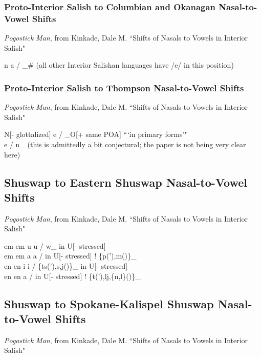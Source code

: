 \documentclass[11pt]{article}
\begin{document}
\subsubsection{Proto-Interior Salish to Columbian and Okanagan Nasal-to-Vowel Shifts}\textit{Pogostick Man}, from Kinkade, Dale M. ``Shifts of Nasals to Vowels in Interior Salish"

n \textrightarrow\hspace{0pt} a / _\# (all other Interior Salishan languages have /e/ in this position) \\

\subsubsection{Proto-Interior Salish to Thompson Nasal-to-Vowel Shifts}\textit{Pogostick Man}, from Kinkade, Dale M. ``Shifts of Nasals to Vowels in Interior Salish"

N[- glottalized] \textrightarrow\hspace{0pt} e / _O[+ same POA] \textquotedblleft \textquoteleft in primary forms'" \\
 \textrightarrow\hspace{0pt} e / n_ (this is admittedly a bit conjectural; the paper is not being very clear here)

\subsection{Shuswap to Eastern Shuswap Nasal-to-Vowel Shifts}\textit{Pogostick Man}, from Kinkade, Dale M. ``Shifts of Nasals to Vowels in Interior Salish"

em em \textrightarrow\hspace{0pt} u u / w_ in U[- stressed] \\
em em \textrightarrow\hspace{0pt} a a / in U[- stressed] ! \{p('),m()\}_ \\
en en \textrightarrow\hspace{0pt} i i / \{ts('),s,j()\}_ in U[- stressed] \\
en en \textrightarrow\hspace{0pt} a  / in U[- stressed] ! \{t('),l\super j,\{n,l\}()\}_

\subsection{Shuswap to Spokane-Kalispel Shuswap Nasal-to-Vowel Shifts}\textit{Pogostick Man}, from Kinkade, Dale M. ``Shifts of Nasals to Vowels in Interior Salish"
\end{document}
